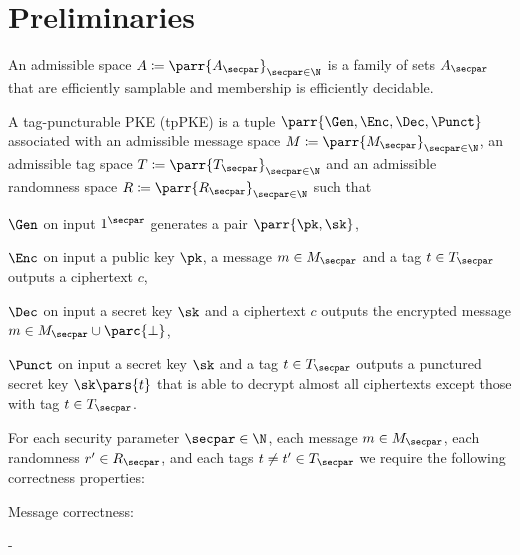 \section{Preliminaries}
\label{sec:prelims}

\begin{definition}
    An admissible space \(A \coloneqq \parr{A_\secpar}_{\secpar \in \N}\) is a family of sets \(A_\secpar\) that are efficiently samplable and membership is efficiently decidable.
\end{definition}

\begin{definition}
    A tag-puncturable PKE (tpPKE) is a tuple \(\parr{\Gen,\Enc,\Dec,\Punct}\) associated with an admissible message space \(M \coloneqq \parr{M_\secpar}_{\secpar \in \N}\),
    an admissible tag space \(T \coloneqq \parr{T_\secpar}_{\secpar \in \N}\) and
    an admissible randomness space \(R \coloneqq \parr{R_\secpar}_{\secpar \in \N}\) such that
    \begin{sitemize}
        \item \(\Gen\) on input \(1^\secpar\) generates a pair \(\parr{\pk,\sk}\),
        \item \(\Enc\) on input a public key \(\pk\), a message \(m \in M_\secpar\) and a tag \(t \in T_\secpar\) outputs a ciphertext \(c\),
        \item \(\Dec\) on input a secret key \(\sk\) and a ciphertext \(c\) outputs the encrypted message \(m \in M_\secpar \cup \parc{\bot}\),
        \item \(\Punct\) on input a secret key \(\sk\) and a tag \(t \in T_\secpar\) outputs a punctured secret key \(\sk\pars{t}\) that is able to decrypt almost all ciphertexts except those with tag \(t \in T_\secpar\).
    \end{sitemize}
    For each security parameter \(\secpar \in \N\),
    each message \(m \in M_\secpar\),
    each randomness \(r' \in R_\secpar\),
    and each tags \(t \neq t' \in T_\secpar\) we require the following correctness properties:
    \begin{sitemize}
        \item Message correctness:
        \begin{bralign}
             - \negl\parr{\secpar}
        \end{bralign}


\end{sitemize}
\end{definition}
